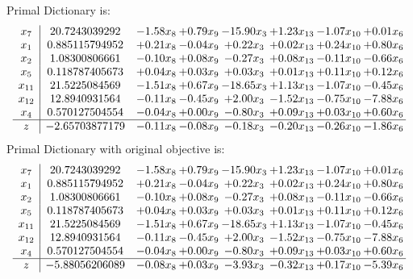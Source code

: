 \documentclass[9pt]{article}
\begin{document}
Primal Dictionary is:
\[\begin{array}{c| c c@{\hskip 2pt} c@{\hskip 2pt} c@{\hskip 2pt} c@{\hskip 2pt} c@{\hskip 2pt} c@{\hskip 2pt} }
 x_{7}   &  20.7243039292 & -1.58 x_{8} & +  0.79 x_{9} & -15.90 x_{3} & +  1.23 x_{13} & -1.07 x_{10} & +  0.01 x_{6}\\
 x_{1}   &  0.885115794952 & +  0.21 x_{8} & -0.04 x_{9} & +  0.22 x_{3} & +  0.02 x_{13} & +  0.24 x_{10} & +  0.80 x_{6}\\
 x_{2}   &  1.08300806661 & -0.10 x_{8} & +  0.08 x_{9} & -0.27 x_{3} & +  0.08 x_{13} & -0.11 x_{10} & -0.66 x_{6}\\
 x_{5}   &  0.118787405673 & +  0.04 x_{8} & +  0.03 x_{9} & +  0.03 x_{3} & +  0.01 x_{13} & +  0.11 x_{10} & +  0.12 x_{6}\\
 x_{11}   &  21.5225084569 & -1.51 x_{8} & +  0.67 x_{9} & -18.65 x_{3} & +  1.13 x_{13} & -1.07 x_{10} & -0.45 x_{6}\\
 x_{12}   &  12.8940931564 & -0.11 x_{8} & -0.45 x_{9} & +  2.00 x_{3} & -1.52 x_{13} & -0.75 x_{10} & -7.88 x_{6}\\
 x_{4}   &  0.570127504554 & -0.04 x_{8} & +  0.00 x_{9} & -0.80 x_{3} & +  0.09 x_{13} & +  0.03 x_{10} & +  0.60 x_{6}\\
\hline
z    &  -2.65703877179 & -0.11 x_{8} & -0.08 x_{9} & -0.18 x_{3} & -0.20 x_{13} & -0.26 x_{10} & -1.86 x_{6}\\
\end{array}\]
Primal Dictionary with original objective is:
\[\begin{array}{c| c c@{\hskip 2pt} c@{\hskip 2pt} c@{\hskip 2pt} c@{\hskip 2pt} c@{\hskip 2pt} c@{\hskip 2pt} }
 x_{7}   &  20.7243039292 & -1.58 x_{8} & +  0.79 x_{9} & -15.90 x_{3} & +  1.23 x_{13} & -1.07 x_{10} & +  0.01 x_{6}\\
 x_{1}   &  0.885115794952 & +  0.21 x_{8} & -0.04 x_{9} & +  0.22 x_{3} & +  0.02 x_{13} & +  0.24 x_{10} & +  0.80 x_{6}\\
 x_{2}   &  1.08300806661 & -0.10 x_{8} & +  0.08 x_{9} & -0.27 x_{3} & +  0.08 x_{13} & -0.11 x_{10} & -0.66 x_{6}\\
 x_{5}   &  0.118787405673 & +  0.04 x_{8} & +  0.03 x_{9} & +  0.03 x_{3} & +  0.01 x_{13} & +  0.11 x_{10} & +  0.12 x_{6}\\
 x_{11}   &  21.5225084569 & -1.51 x_{8} & +  0.67 x_{9} & -18.65 x_{3} & +  1.13 x_{13} & -1.07 x_{10} & -0.45 x_{6}\\
 x_{12}   &  12.8940931564 & -0.11 x_{8} & -0.45 x_{9} & +  2.00 x_{3} & -1.52 x_{13} & -0.75 x_{10} & -7.88 x_{6}\\
 x_{4}   &  0.570127504554 & -0.04 x_{8} & +  0.00 x_{9} & -0.80 x_{3} & +  0.09 x_{13} & +  0.03 x_{10} & +  0.60 x_{6}\\
\hline
z    &  -5.88056206089 & -0.08 x_{8} & +  0.03 x_{9} & -3.93 x_{3} & -0.32 x_{13} & +  0.17 x_{10} & -5.39 x_{6}\\
\end{array}\]
\end{document}
